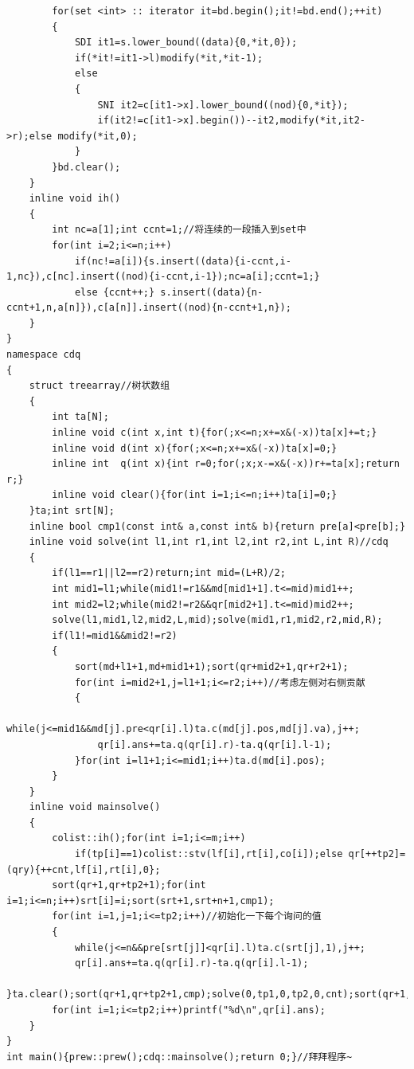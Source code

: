 \begin{verbatim}
        for(set <int> :: iterator it=bd.begin();it!=bd.end();++it)
        {
            SDI it1=s.lower_bound((data){0,*it,0});
            if(*it!=it1->l)modify(*it,*it-1);
            else
            {
                SNI it2=c[it1->x].lower_bound((nod){0,*it});
                if(it2!=c[it1->x].begin())--it2,modify(*it,it2->r);else modify(*it,0);
            }
        }bd.clear();
    }
    inline void ih()
    {
        int nc=a[1];int ccnt=1;//将连续的一段插入到set中
        for(int i=2;i<=n;i++)
            if(nc!=a[i]){s.insert((data){i-ccnt,i-1,nc}),c[nc].insert((nod){i-ccnt,i-1});nc=a[i];ccnt=1;}
            else {ccnt++;} s.insert((data){n-ccnt+1,n,a[n]}),c[a[n]].insert((nod){n-ccnt+1,n});
    }
}
namespace cdq
{   
    struct treearray//树状数组
    {
        int ta[N];
        inline void c(int x,int t){for(;x<=n;x+=x&(-x))ta[x]+=t;}
        inline void d(int x){for(;x<=n;x+=x&(-x))ta[x]=0;}
        inline int  q(int x){int r=0;for(;x;x-=x&(-x))r+=ta[x];return r;}
        inline void clear(){for(int i=1;i<=n;i++)ta[i]=0;}
    }ta;int srt[N];
    inline bool cmp1(const int& a,const int& b){return pre[a]<pre[b];}
    inline void solve(int l1,int r1,int l2,int r2,int L,int R)//cdq
    {
        if(l1==r1||l2==r2)return;int mid=(L+R)/2;
        int mid1=l1;while(mid1!=r1&&md[mid1+1].t<=mid)mid1++;
        int mid2=l2;while(mid2!=r2&&qr[mid2+1].t<=mid)mid2++;
        solve(l1,mid1,l2,mid2,L,mid);solve(mid1,r1,mid2,r2,mid,R);
        if(l1!=mid1&&mid2!=r2)
        {
            sort(md+l1+1,md+mid1+1);sort(qr+mid2+1,qr+r2+1);
            for(int i=mid2+1,j=l1+1;i<=r2;i++)//考虑左侧对右侧贡献
            {
                while(j<=mid1&&md[j].pre<qr[i].l)ta.c(md[j].pos,md[j].va),j++;
                qr[i].ans+=ta.q(qr[i].r)-ta.q(qr[i].l-1);
            }for(int i=l1+1;i<=mid1;i++)ta.d(md[i].pos);
        }
    }
    inline void mainsolve()
    {
        colist::ih();for(int i=1;i<=m;i++)
            if(tp[i]==1)colist::stv(lf[i],rt[i],co[i]);else qr[++tp2]=(qry){++cnt,lf[i],rt[i],0};
        sort(qr+1,qr+tp2+1);for(int i=1;i<=n;i++)srt[i]=i;sort(srt+1,srt+n+1,cmp1);
        for(int i=1,j=1;i<=tp2;i++)//初始化一下每个询问的值
        {
            while(j<=n&&pre[srt[j]]<qr[i].l)ta.c(srt[j],1),j++;
            qr[i].ans+=ta.q(qr[i].r)-ta.q(qr[i].l-1);
        }ta.clear();sort(qr+1,qr+tp2+1,cmp);solve(0,tp1,0,tp2,0,cnt);sort(qr+1,qr+tp2+1,cmp);
        for(int i=1;i<=tp2;i++)printf("%d\n",qr[i].ans);
    }
}
int main(){prew::prew();cdq::mainsolve();return 0;}//拜拜程序~
\end{verbatim}

